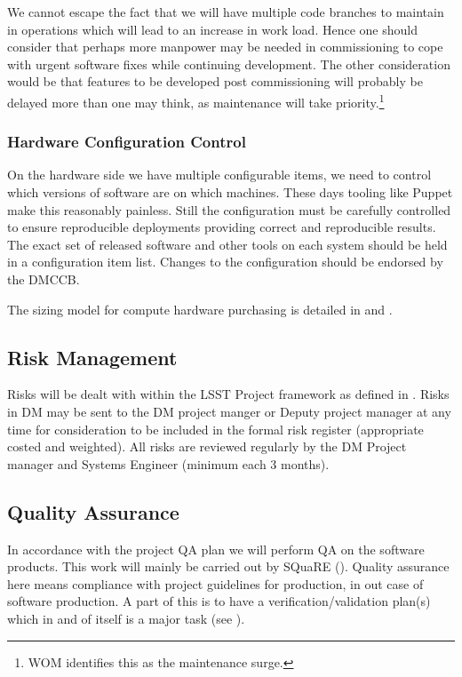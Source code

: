 We cannot escape the fact that we  will have multiple code branches to maintain in operations which will lead to an increase in work load.
Hence one should consider that perhaps more manpower may be needed in commissioning to cope with urgent software fixes while continuing development.
The other consideration would be that features to be developed post commissioning will probably be delayed more than one may think, as maintenance will take priority.\footnote{WOM identifies this as the maintenance surge.}

\subsubsection{Hardware Configuration Control}

On the hardware side we have multiple configurable items, we need to control which versions of software are on which machines. These days tooling like Puppet make this reasonably painless. Still the configuration  must be carefully controlled to ensure reproducible deployments providing correct and reproducible results. The exact set of released software and other tools on each system should be held in a configuration item list.
Changes to the configuration should be endorsed by the DMCCB.

The sizing model for compute hardware purchasing is detailed in   and .

\subsection {Risk Management } \label{sect:risk}

Risks will be dealt with within the LSST Project framework as defined in .
Risks in DM may be sent to the DM project manger or Deputy project manager at any time for consideration to be included in the formal risk register (appropriate costed and weighted). All risks are reviewed regularly by the DM Project manager and Systems Engineer (minimum each 3 months).


\subsection {Quality Assurance  } \label{sect:pa}

In accordance with the project QA plan  we will perform QA on the software products.
This work will mainly be carried out by SQuaRE ().
Quality assurance here means compliance with project guidelines for production, in out case of software production.
A part of this is to have a verification/validation plan(s) which in and of itself is a major task (see ).


